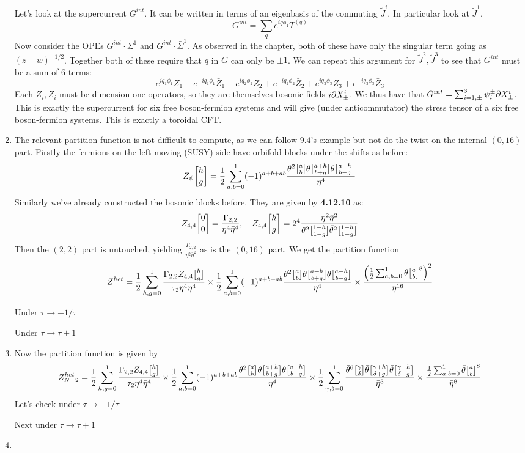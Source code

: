 \documentclass[11pt, class=article, crop=false]{standalone}
\begin{document}
\begin{enumerate}
	Let's look at the supercurrent $G^{int}$. It can be written in terms of an eigenbasis of the commuting $\tilde J^i$. In particular look at $\tilde J^1$. 
	\[
		G^{int} = \sum_q e^{i q \phi_1} T^{(q)} 
	\]
	 Now consider the OPEs $G^{int} \cdot \Sigma^1$ and $G^{int} \cdot \bar \Sigma^1$. As observed in the chapter, both of these have only the singular term going as $(z-w)^{-1/2}$. Together both of these require that $q$ in $G$ can only be $\pm 1$. We can repeat this argument for $\tilde J^2, \tilde J^3$ to see that $G^{int}$ must be a sum of $6$ terms:
	 \[
	 	 e^{i q_1 \phi_1} Z_1 + e^{-i q_1 \phi_1} \bar Z_1 + e^{i q_2 \phi_2} Z_2 + e^{-i q_2 \phi_2} \bar Z_2 + e^{i q_3 \phi_3} Z_3 + e^{-i q_3 \phi_3} \bar Z_3
	 \]
	 Each $Z_i, \bar Z_i$ must be dimension one operators, so they are themselves bosonic fields $i \partial X^i_\pm$. We thus have that $G^{int} = \sum_{i=1, \pm}^3 \psi_i^\pm \partial X^i_{\pm}$. This is exactly the supercurrent for six free boson-fermion systems and will give (under anticommutator) the stress tensor of a six free boson-fermion systems. This is exactly a toroidal CFT.
	\item The relevant partition function is not difficult to compute, as we can follow $9.4$'s example but not do the twist on the internal $(0,16)$ part. Firstly the fermions on the left-moving (SUSY) side have orbifold blocks under the shifts as before:
	\[
		Z_{\psi}\twist{h}{g} = \frac12 \sum_{a,b=0}^1 (-1)^{a+b+ab} \frac{\theta^2 \twist{a}{b} \theta \twist{a+h}{b+g} \theta \twist{a-h}{b-g}}{\eta^4}
	\]
	Similarly we've already constructed the bosonic blocks before. They are given by \textbf{4.12.10} as:
	\[
		Z_{4,4}\twist00 = \frac{\Gamma_{2,2}}{\eta^4 \bar \eta^4}, \quad Z_{4,4} \twist{h}{g} = 2^4 \frac{\eta^2 \bar \eta^2}{\theta^2 \twist{1-h}{1-g} \bar \theta^2 \twist{1-h}{1-g}}
	\]
	Then the $(2,2)$ part is untouched, yielding $\frac{\Gamma_{2,2}}{\eta^2 \bar \eta^2}$ as is the $(0,16)$ part. We get the partition function
	\[
		Z^{het} = \frac12 \sum_{h,g=0}^1 \frac{\Gamma_{2,2} Z_{4,4} \twist{h}{g}}{\tau_2 \eta^4 \bar \eta^4} \times \frac12 \sum_{a,b=0}^1 (-1)^{a+b+ab} \frac{\theta^2 \twist{a}{b} \theta \twist{a+h}{b+g} \theta \twist{a-h}{b-g}}{\eta^4} \times \frac{\left(\frac12 \sum_{a,b=0}^1 \bar \theta \twist ab^8 \right)^2}{\bar \eta^{16}}
	\]
	
	Under $\tau \to -1/\tau$
	
	Under $\tau \to \tau + 1$
	
	\item Now the partition function is given by
	\[
		Z^{het}_{N=2} = \frac12 \sum_{h,g=0}^1 \frac{\Gamma_{2,2} Z_{4,4} \twist{h}{g}}{\tau_2 \eta^4 \bar \eta^4} 
		\times \frac12 \sum_{a,b=0}^1 (-1)^{a+b+ab} \frac{\theta^2 \twist{a}{b} \theta \twist{a+h}{b+g} \theta \twist{a-h}{b-g}}{\eta^4}
		\times \frac12 \sum_{\gamma,\delta=0}^1 \frac{\bar \theta^6 \twist{\gamma}{\delta} \bar \theta \twist{\gamma+h}{\delta+g} \bar \theta \twist{\gamma-h}{\delta-g}}{\bar \eta^8} 
		 \times \frac{\frac12 \sum_{a,b=0}^1 \bar \theta \twist ab^8 }{\bar \eta^{8}}
	\]
	Let's check under $\tau \to -1/\tau$
	
	Next under $\tau \to \tau + 1$
	
	\item 
	
\end{enumerate}

\end{document}
